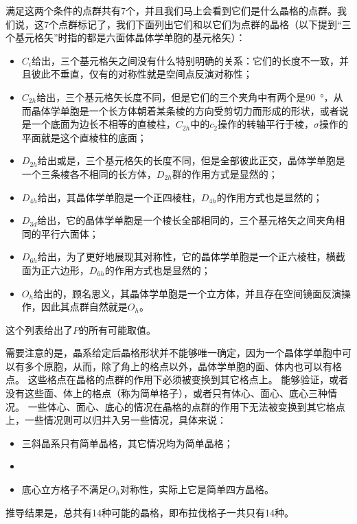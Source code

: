 满足这两个条件的点群共有7个，并且我们马上会看到它们是什么晶格的点群。我们说，这7个点群标记了，我们下面列出它们和以它们为点群的晶格（以下提到“三个基元格矢”时指的都是六面体晶体学单胞的基元格矢）：
\begin{itemize}
    \item $C_i$给出，三个基元格矢之间没有什么特别明确的关系：它们的长度不一致，并且彼此不垂直，仅有的对称性就是空间点反演对称性；
    \item $C_{2h}$给出，三个基元格矢长度不同，但是它们的三个夹角中有两个是\SI{90}{\degree}，从而晶体学单胞是一个长方体朝着某条棱的方向受剪切力而形成的形状，或者说是一个底面为边长不相等的直棱柱，$C_{2h}$中的$c_2$操作的转轴平行于棱，$\sigma$操作的平面就是这个直棱柱的底面；
    \item $D_{2h}$给出或是，三个基元格矢的长度不同，但是全部彼此正交，晶体学单胞是一个三条棱各不相同的长方体，$D_{2h}$群的作用方式是显然的；
    \item $D_{4h}$给出，其晶体学单胞是一个正四棱柱，$D_{4h}$的作用方式也是显然的；
    \item $D_{3d}$给出，它的晶体学单胞是一个棱长全部相同的，三个基元格矢之间夹角相同的平行六面体；
    \item $D_{6h}$给出，为了更好地展现其对称性，它的晶体学单胞是一个正六棱柱，横截面为正六边形，$D_{6h}$的作用方式也是显然的；
    \item $O_h$给出的，顾名思义，其晶体学单胞是一个立方体，并且存在空间镜面反演操作，因此其点群自然就是$O_h$。
\end{itemize}
这个列表给出了$P$的所有可能取值。

需要注意的是，晶系给定后晶格形状并不能够唯一确定，因为一个晶体学单胞中可以有多个原胞，从而，除了角上的格点以外，晶体学单胞的面、体内也可以有格点。
这些格点在晶格的点群的作用下必须被变换到其它格点上。
能够验证，或者没有这些面、体上的格点（称为简单格子），或者只有体心、面心、底心三种情况。
一些体心、面心、底心的情况在晶格的点群的作用下无法被变换到其它格点上，一些情况则可以归并入另一些情况，具体来说：
\begin{itemize}
    \item 三斜晶系只有简单晶格，其它情况均为简单晶格；
    \item %
    \item 底心立方格子不满足$O_h$对称性，实际上它是简单四方晶格。
\end{itemize}
推导结果是，总共有14种可能的晶格，即布拉伐格子一共只有14种。

